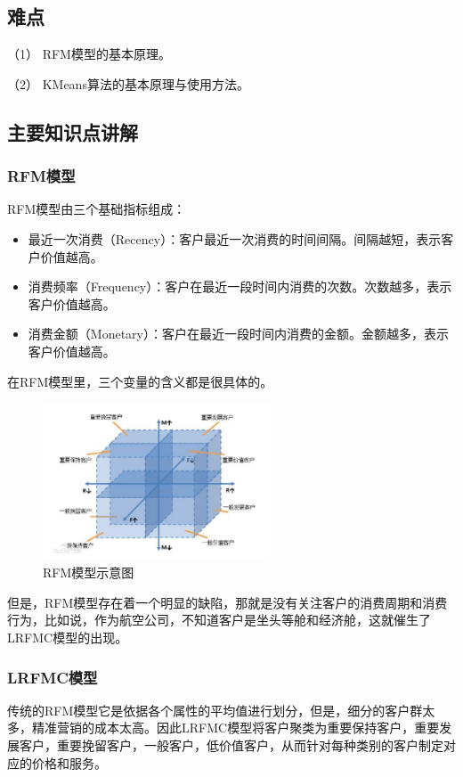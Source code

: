\documentclass[UTF8,12pt]{article}
\begin{document}
\subsection{难点}
（1） RFM模型的基本原理。

（2） KMeans算法的基本原理与使用方法。

\subsection{主要知识点讲解}
\subsubsection{RFM模型}
RFM模型由三个基础指标组成：
\begin{itemize}
    \item 最近一次消费（Recency）：客户最近一次消费的时间间隔。间隔越短，表示客户价值越高。
    \item 消费频率（Frequency）：客户在最近一段时间内消费的次数。次数越多，表示客户价值越高。
    \item 消费金额（Monetary）：客户在最近一段时间内消费的金额。金额越多，表示客户价值越高。
\end{itemize}
在RFM模型里，三个变量的含义都是很具体的。
\begin{figure}[htbp]
    \centering
    \includegraphics[width=0.6\textwidth]{img/1.png}
    \caption{RFM模型示意图}
\end{figure}

\newpage
但是，RFM模型存在着一个明显的缺陷，那就是没有关注客户的消费周期和消费行为，比如说，作为航空公司，不知道客户是坐头等舱和经济舱，这就催生了LRFMC模型的出现。

\subsubsection{LRFMC模型}
传统的RFM模型它是依据各个属性的平均值进行划分，但是，细分的客户群太多，精准营销的成本太高。因此LRFMC模型将客户聚类为重要保持客户，重要发展客户，重要挽留客户，一般客户，低价值客户，从而针对每种类别的客户制定对应的价格和服务。
\end{document}
